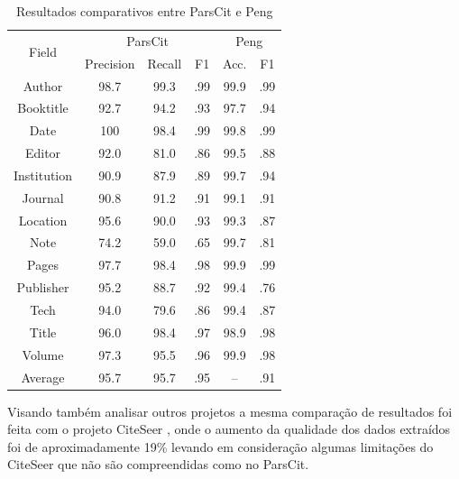 \begin{table}
    \caption{Resultados comparativos entre ParsCit e Peng \cite{Peng-CRF-IE}}
    \begin{center}
        \begin{tabular}{|c|c|c|c|c|c|}
            \hline 
            \multirow{2}{*}{Field} & \multicolumn{3}{c|}{ParsCit} & \multicolumn{2}{c|}{Peng} \\
            \cline{2-6}
             & Precision & Recall & F1 & Acc. & F1 \\ 
            \hline
            Author & 98.7 & 99.3 & .99 & 99.9 & .99 \\
            Booktitle & 92.7 & 94.2 & .93 & 97.7 & .94 \\
            Date & 100 & 98.4 & .99 & 99.8 & .99 \\
            Editor & 92.0 & 81.0 & .86 & 99.5 & .88 \\
            Institution & 90.9 & 87.9 & .89 & 99.7 & .94 \\
            Journal & 90.8 & 91.2 & .91 & 99.1 & .91 \\
            Location & 95.6 & 90.0 & .93 & 99.3 & .87 \\
            Note & 74.2 & 59.0 & .65 & 99.7 & .81 \\
            Pages & 97.7 & 98.4 & .98 & 99.9 & .99  \\
            Publisher & 95.2 & 88.7 & .92 & 99.4 & .76 \\
            Tech & 94.0 & 79.6 & .86 & 99.4 & .87 \\
            Title & 96.0 & 98.4 & .97 & 98.9 & .98 \\
            Volume & 97.3 & 95.5 & .96 & 99.9 & .98 \\
            \hline
            Average & 95.7 & 95.7 & .95 & – & .91 \\
            \hline
        \end{tabular}
    \end{center}
    \label{tab:parscit-results}
\end{table}

Visando também analisar outros projetos a mesma comparação de resultados foi feita com o projeto CiteSeer \cite{citeseer}, onde o aumento da qualidade dos dados extraídos foi de aproximadamente 19\% levando em consideração algumas limitações do CiteSeer que não são compreendidas como no ParsCit.


	


